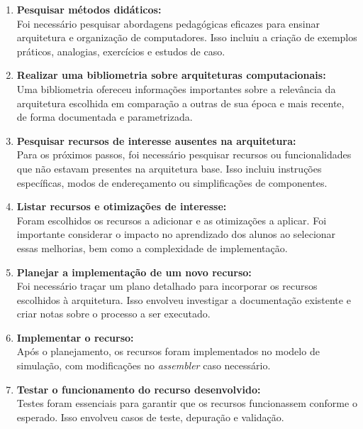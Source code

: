 \documentclass[
	12pt,				%
	openright,			%
	oneside,			%
	a4paper,			%
	english,			%
	french,				%
	spanish,			%
	brazil,				%
	]{abntex2}
\begin{document}
\begin{enumerate}[label=\textbf{\arabic*.}]
    \item \textbf{Pesquisar métodos didáticos:} \\
    Foi necessário pesquisar abordagens pedagógicas eficazes para ensinar arquitetura e organização de computadores. Isso incluiu a criação de exemplos práticos, analogias, exercícios e estudos de caso.
        
    \item  \textbf{Realizar uma bibliometria sobre arquiteturas computacionais:}\\
    Uma bibliometria ofereceu informações importantes sobre a relevância da arquitetura escolhida em comparação a outras de sua época e mais recente, de forma documentada e parametrizada.
    
    \item \textbf{Pesquisar recursos de interesse ausentes na arquitetura:} \\
    Para os próximos passos, foi necessário pesquisar recursos ou funcionalidades que não estavam presentes na arquitetura base. Isso incluiu instruções específicas, modos de endereçamento ou simplificações de componentes.
    
    \item \textbf{Listar recursos e otimizações de interesse:} \\
    Foram escolhidos os recursos a adicionar e as otimizações a aplicar. Foi importante considerar o impacto no aprendizado dos alunos ao selecionar essas melhorias, bem como a complexidade de implementação.
    
    \item \textbf{Planejar a implementação de um novo recurso:} \\
    Foi necessário traçar um plano detalhado para incorporar os recursos escolhidos à arquitetura. Isso envolveu investigar a documentação existente e criar notas sobre o processo a ser executado.
    
    \item \textbf{Implementar o recurso:} \\
    Após o planejamento, os recursos foram implementados no modelo de simulação, com modificações no \textit{assembler} caso necessário.
    
    \item \textbf{Testar o funcionamento do recurso desenvolvido:} \\
    Testes foram essenciais para garantir que os recursos funcionassem conforme o esperado. Isso envolveu casos de teste, depuração e validação.
    

\end{enumerate}
\end{document}
